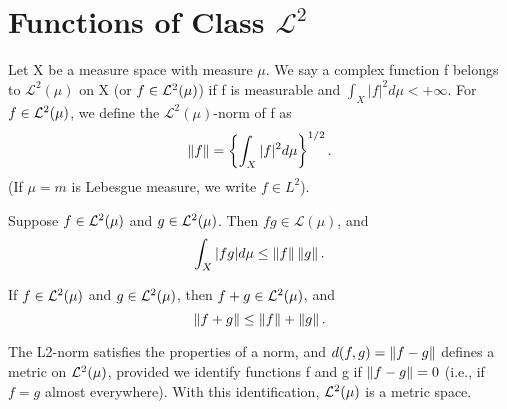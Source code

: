 


\section{Functions of Class \texorpdfstring{$\mathcal{L}^2$}{L2}}

\begin{definition}
  \label{def:chap11:L2_space}
  Let X be a measure space with measure $\mu$. We say a complex
  function f belongs to $\mathcal{L}^2(\mu)$ on X (or $f \in
  \mathcal{L}^{2}(\mu)$) if f is measurable and $\int_X |f|^2 d\mu < +\infty$.
  For $f \in \mathcal{L}^{2}(\mu)$, we define the $\mathcal{L}^2(\mu)$-norm of f as
  \[
    \left\lVert f \right\rVert = \left\{ \int_X |f|^2 d\mu \right\}^{1/2}.
  \]
  (If $\mu=m$ is Lebesgue measure, we write $f \in L^2$).
\end{definition}

\begin{theorem}
  \label{thm:chap11:schwarz_inequality_integral}
  Suppose $f \in \mathcal{L}^{2}(\mu)$ and $g \in \mathcal{L}^{2}(\mu)$. Then $fg \in
  \mathcal{L}(\mu)$, and
  \[
    \int_X |fg| d\mu \le \left\lVert f \right\rVert \left\lVert g \right\rVert.
  \]
\end{theorem}

\begin{theorem}
  \label{thm:chap11:triangle_inequality_L2}
  If $f \in \mathcal{L}^{2}(\mu)$ and $g \in \mathcal{L}^{2}(\mu)$, then $f+g \in
  \mathcal{L}^{2}(\mu)$, and
  \[
    \left\lVert f+g \right\rVert \le \left\lVert f \right\rVert + \left\lVert g \right\rVert.
  \]
\end{theorem}

\begin{remark}
  \label{rem:chap11:L2_metric_space}
  The L2-norm satisfies the properties of a norm, and $d(f, g) =
  \left\lVert f-g \right\rVert$ defines a metric on $\mathcal{L}^{2}(\mu)$, provided we identify
  functions f and g if $\left\lVert f-g \right\rVert=0$ (i.e., if $f = g$ almost
  everywhere). With this identification, $\mathcal{L}^{2}(\mu)$ is a metric space.
\end{remark}

